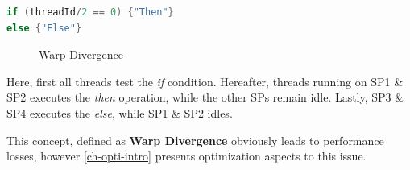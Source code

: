 \begin{lstlisting}[language=C,caption={Devergence generating code},label=lst:threaddiv]
if (threadId/2 == 0) {"Then"} 
else {"Else"}
\end{lstlisting}

 
\begin{figure}[ht]
	\centering
	\caption{Warp Divergence}
	\label{fig:hw-warp-div}
\end{figure}

Here, first all threads test the \textit{if} condition.
Hereafter, threads running on SP1 \& SP2 executes the \textit{then} operation, while the other SPs remain idle.
Lastly, SP3 \& SP4 executes the \textit{else}, while SP1 \& SP2 idles.

This concept, defined as \textbf{Warp Divergence} obviously leads to performance losses, however \cref{ch-opti-intro} presents optimization aspects to this issue. 







